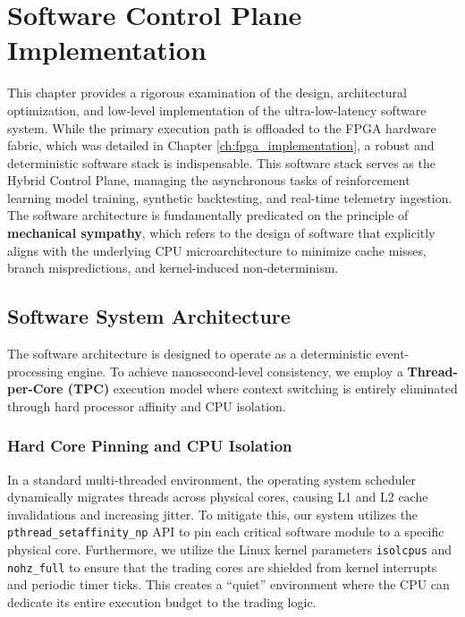 \chapter{Software Control Plane Implementation}
\label{ch:software_implementation}

This chapter provides a rigorous examination of the design, architectural optimization, and low-level implementation of the ultra-low-latency software system. While the primary execution path is offloaded to the FPGA hardware fabric, which was detailed in Chapter \ref{ch:fpga_implementation}, a robust and deterministic software stack is indispensable. This software stack serves as the Hybrid Control Plane, managing the asynchronous tasks of reinforcement learning model training, synthetic backtesting, and real-time telemetry ingestion. The software architecture is fundamentally predicated on the principle of \textbf{mechanical sympathy}, which refers to the design of software that explicitly aligns with the underlying CPU microarchitecture to minimize cache misses, branch mispredictions, and kernel-induced non-determinism.

\section{Software System Architecture}

The software architecture is designed to operate as a deterministic event-processing engine. To achieve nanosecond-level consistency, we employ a \textbf{Thread-per-Core (TPC)} execution model where context switching is entirely eliminated through hard processor affinity and CPU isolation.

\subsection{Hard Core Pinning and CPU Isolation}
In a standard multi-threaded environment, the operating system scheduler dynamically migrates threads across physical cores, causing L1 and L2 cache invalidations and increasing jitter. To mitigate this, our system utilizes the \texttt{pthread\_setaffinity\_np} API to pin each critical software module to a specific physical core. Furthermore, we utilize the Linux kernel parameters \texttt{isolcpus} and \texttt{nohz\_full} to ensure that the trading cores are shielded from kernel interrupts and periodic timer ticks. This creates a ``quiet'' environment where the CPU can dedicate its entire execution budget to the trading logic.

